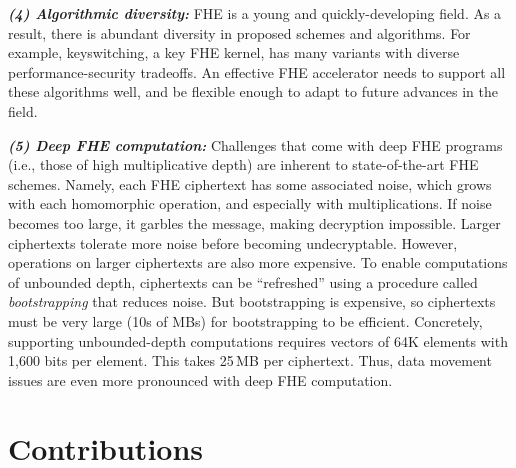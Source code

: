 \noindent \textbf{\emph{(4) Algorithmic diversity:}}
FHE is a young and quickly-developing field. As a result, there is abundant
diversity in proposed schemes and algorithms. For example, keyswitching, a key
FHE kernel, has many variants with diverse performance-security tradeoffs. An
effective FHE accelerator needs to support all these algorithms well, and be
flexible enough to adapt to future advances in the field.

\noindent \textbf{\emph{(5) Deep FHE computation:}}
Challenges that come with deep FHE programs (i.e., those of high multiplicative
depth) are inherent to state-of-the-art FHE schemes. Namely, each FHE
ciphertext has some associated noise, which grows with each homomorphic
operation, and especially with multiplications. If noise becomes too large, it
garbles the message, making decryption impossible. Larger ciphertexts tolerate
more noise before becoming undecryptable. However, operations on larger
ciphertexts are also more expensive. To enable computations of unbounded depth,
ciphertexts can be ``refreshed'' using a procedure called \emph{bootstrapping}
that reduces noise. But bootstrapping is expensive, so ciphertexts must be very
large (10s of MBs) for bootstrapping to be efficient. Concretely, supporting
unbounded-depth computations requires vectors of 64K elements with 1,600 bits
per element. This takes 25\,MB per ciphertext. Thus, data movement issues are
even more pronounced with deep FHE computation.

\section{Contributions}

